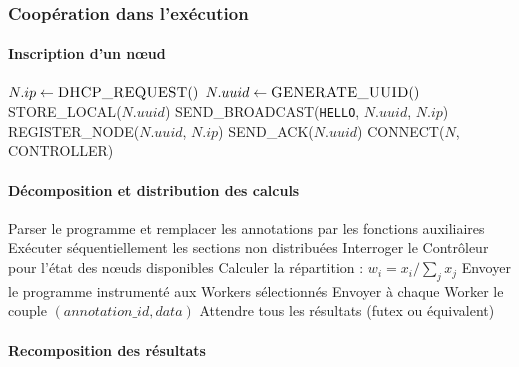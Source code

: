 \documentclass[12pt,a4paper]{report}
\begin{document}
\subsubsection{Coopération dans l'exécution}

\paragraph{Inscription d'un nœud}

\begin{algorithm}[H]
\caption{Entrée d'un nœud dans le réseau}
\label{alg:node_join}
\begin{algorithmic}[1]
\State $N.ip \gets \textsc{DHCP\_REQUEST}()$
\State $N.uuid \gets \textsc{GENERATE\_UUID}()$
\State \textsc{STORE\_LOCAL}($N.uuid$)
\State \textsc{SEND\_BROADCAST}(\texttt{HELLO}, $N.uuid$, $N.ip$)
    \State \textsc{REGISTER\_NODE}($N.uuid$, $N.ip$)
    \State \textsc{SEND\_ACK}($N.uuid$)
\EndIf
\State \textsc{CONNECT}($N$, \textsc{CONTROLLER})
\end{algorithmic}
\end{algorithm}

\paragraph{Décomposition et distribution des calculs}

\begin{algorithm}[H]
\caption{Processus de décomposition}
\label{alg:decomposition}
\begin{algorithmic}[1]
\State Parser le programme et remplacer les annotations par les fonctions auxiliaires
\State Exécuter séquentiellement les sections non distribuées
    \State Interroger le Contrôleur pour l'état des nœuds disponibles
    \State Calculer la répartition : $w_i = x_i / \sum_{j} x_j$
    \State Envoyer le programme instrumenté aux Workers sélectionnés
    \State Envoyer à chaque Worker le couple $(annotation\_id, data)$
\EndFor
\State Attendre tous les résultats (futex ou équivalent)
\end{algorithmic}
\end{algorithm}

\paragraph{Recomposition des résultats}
\end{document}
